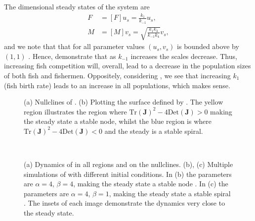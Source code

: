 \begin{example}[frametitle=Fishing]
{The dimensional steady states of the system are
\begin{align}
F&=[F]u_s=\frac{k_1}{k_{-1}}u_s,\label{F_scale}\\
M&=[M]v_s=\sqrt{\frac{k_1k_3}{k_{-1}k_4}}v_s,\label{M_scale}
\end{align}
and we note that that for all parameter values $(u_s,v_s)$ is bounded above by $(1,1)$ . Hence,  demonstrate that as $k_{-1}$ increases the scales decrease. Thus, increasing fish competition will, overall, lead to a decrease in the population sizes of both fish and fishermen. Oppositely, considering , we see that increasing $k_1$ (fish birth rate) leads to an increase in all populations, which makes sense.}
\end{example}
\begin{figure}[!!!h!!!tbp]
\centering
{}
\caption{\label{Fishing_figs} (a) Nullclines of . (b) Plotting the surface defined by . The yellow region illustrates the region where $\textrm{Tr}(\bm{J})^2-4\textrm{Det}(\bm{J})>0$ making the steady state a stable node, whilst the blue region is where  $\textrm{Tr}(\bm{J})^2-4\textrm{Det}(\bm{J})<0$ and the  steady is a stable spiral.}
\end{figure}
\begin{figure}[!!!h!!!tbp]
\centering
{}
\\
\caption{\label{Fishing_dyanamics} (a) Dynamics of  in all regions and on the nullclines. (b), (c) Multiple simulations of  with different initial conditions. In (b) the parameters are $\alpha=4$, $\beta=4$, making the steady state a stable node . In (c) the parameters are $\alpha=4$, $\beta=1$, making the steady state a stable spiral . The insets of each image demonstrate the dynamics very close to the steady state.}
\end{figure} 

